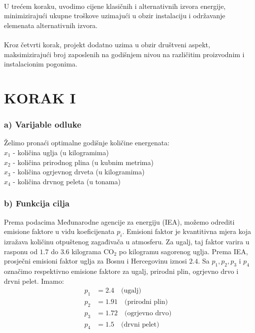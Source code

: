\documentclass[12pt, a4paper]{paper}
\begin{document}
\paragraph{}
U trećem koraku, uvodimo cijene klasičnih i alternativnih izvora energije, minimizirajući ukupne troškove uzimajući u obzir instalaciju i održavanje elemenata alternativnih izvora.
\paragraph{}
Kroz četvrti korak, projekt dodatno uzima u obzir društveni aspekt, maksimizirajući broj zaposlenih na godišnjem nivou na različitim proizvodnim i instalacionim pogonima.

\newpage
\section*{KORAK I}

\subsubsection*{a) Varijable odluke}

Želimo pronaći optimalne godišnje količine energenata:\\

$x_1$ - količina uglja (u kilogramima)\\
$x_2$ - količina prirodnog plina (u kubnim metrima)\\
$x_3$ - količina ogrjevnog drveta (u kilogramima)\\
$x_4$ - količina drvnog peleta (u tonama)

\subsubsection*{b) Funkcija cilja}

Prema podacima Međunarodne agencije za energiju (IEA), možemo odrediti emisione faktore u vidu koeficijenata $p_i$. Emisioni faktor je kvantitivna mjera koja izražava količinu otpuštenog zagađivača u atmosferu. Za ugalj, taj faktor varira u rasponu od $1.7$ do $3.6$ kilograma CO$_2$ po kilogramu sagorenog uglja. Prema IEA, prosječni emisioni faktor uglja za Bosnu i Hercegovinu iznosi $2.4$. Sa $p_1, p_2, p_3$ i $p_4$ označimo respektivno emisione faktore za ugalj, prirodni plin, ogrjevno drvo i drvni pelet. Imamo:
\begin{align*}
p_1 &= 2.4 \quad \text{(ugalj)} \\
p_2 &= 1.91 \quad \text{(prirodni plin)} \\
p_3 &= 1.72 \quad \text{(ogrjevno drvo)} \\
p_4 &= 1.5 \quad \text{(drvni pelet)}
\end{align*}
\end{document}

